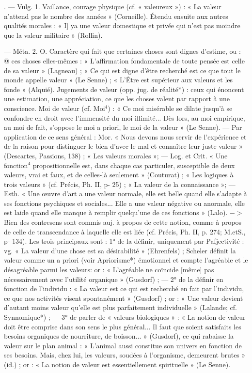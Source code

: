 	\begin{itemize}[leftmargin=1cm, label=, itemsep=1pt]
. — Vulg. 1. Vaillance, courage
physique (cf. « valeureux ») : « La
valeur n'attend pas le nombre des
années » (Corneille). Étendu ensuite
aux autres qualités morales : « I] ya
une valeur domestique et privée
qui n’est pas moindre que la valeur
militaire » (Rollin).

— Méta. 2. O. Caractère qui fait
que certaines choses sont dignes
d'estime, ou : @ ces choses elles-mêmes : « L’affirmation fondamentale de toute pensée est celle de sa
valeur » (Lagneau) ; « Ce qui est
digne d’être recherché est ce que
tout le monde appelle valeur »
(Le Senne) ; « L’Être est supérieur
aux valeurs et les fonde » (Alquié).
Jugements de valeur (opp. jug. de
réalité*) : ceux qui énoncent une
estimation, une appréciation, ce que
les choses valent par rapport à une
conscience. Moi de valeur (cf. Moi$^4$) :
« Ce moi misérable se dilate jusqu’à
se confondre en droit avec l’immensité du moi illimité... Dès lors, au
moi empirique, au moi de fait, s’oppose le moi a priori, le moi de la
valeur » (Le Senne). — Par application de ce sens général : Mor. « Nous
devons nous servir de l'expérience
et de la raison pour distinguer le
bien d'avec le mal et connaître leur
juste valeur » (Descartes, Passions,
138) ; « Les valeurs morales »; —
Log. et Crit. « Une fonction$^4$ propositionnelle est, dans chaque cas particuler, susceptible de deux valeurs,
vrai et faux, et de celles-là seulement » (Couturat) ; « Les logiques à
trois valeurs » (cf. Précis, Ph. II,
p- 25) ; « La valeur de la connaissance »; — Esth. « Une œuvre d’art
a une valeur normale, elle est belle
quand elle s’adapte à ses fonctions
psychiques et sociales... Elle a une
valeur négative ou anormale, elle
est laide quand elle manque à remplir quelqu’une de ces fonctions »
(Lalo). $->$ Bien des contresens
sont commis auj. à propos de cette
notion, comme à propos de celle de
transcendance à laquelle elle est liée
(cf. Précis, Ph. II, p. 274; M.etS.,
p- 134). Les trois principaux sont :
1° de la définir, uniquement par
Pafjectivité : vg. « La valeur d’une
chose est sa désirabilité » (Ehrenfels) ; Scheler définit la valeur comme
un a priori (voir Apriorisme*) émotionnel et compte l’agréable et le
désagréable parmi les valeurs: or :
« L’agréable ne coïncide [même] pas
nécessairement avec l'utilité organique » (Gusdorf) ; — 2° de la définir
en fonction de l'individu : « La
valeur est ce qui est recherché en
fait par l'individu, ce que nos activités visent spontanément » (Gusdorf) ; or : « Une valeur devient
d'autant moins valeur qu’elle est
plus parfaitement individuelle »
(Lalande; cf. Synnomique*) ; —
3° de parler de « valeurs biologiques » : « La notion de valeur doit
être comprise dans son sens le plus
général... Il faut que soient satisfaits les besoins organiques de nourriture, de boisson... » (Gusdorf), ce
qui rabaisse la valeur sur le plan
animal : « L'animal aussi constitue
son univers en fonction de ses besoins. Mais, chez lui, les valeurs,
soudées à l'organisme, demeurent
brutes » (id.) ; or : « La notion de
valeur est essentiellement spirituelle » (Le Senne).


\end{itemize}
